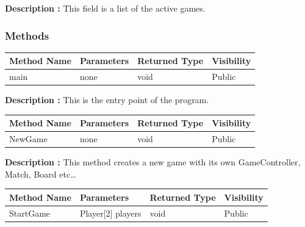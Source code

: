 \documentclass[12pt]{article}
\begin{document}
    \textbf{Description :} This field is a list of the active games.

    \subsubsection{Methods}

    \begin{table}[H]
        \begin{tabular}{|l|l|l|l|}
            \hline
            \rowcolor[HTML]{EFEFEF}
            \cellcolor[HTML]{EFEFEF}\textbf{Method Name} & \textbf{Parameters} & \textbf{Returned Type} & \textbf{Visibility} \\ \hline
            main                                         & none                & void                   & Public              \\ \hline
        \end{tabular}
    \end{table}

    \textbf{Description :} This is the entry point of the program.

    \begin{table}[H]
        \begin{tabular}{|l|l|l|l|}
            \hline
            \rowcolor[HTML]{EFEFEF}
            \cellcolor[HTML]{EFEFEF}\textbf{Method Name} & \textbf{Parameters} & \textbf{Returned Type} & \textbf{Visibility} \\ \hline
            NewGame                                      & none                & void                   & Public              \\ \hline
        \end{tabular}
    \end{table}

    \textbf{Description :} This method creates a new game with its own GameController, Match, Board etc\dots

    \begin{table}[H]
        \begin{tabular}{|l|l|l|l|}
            \hline
            \rowcolor[HTML]{EFEFEF}
            \cellcolor[HTML]{EFEFEF}\textbf{Method Name} & \textbf{Parameters} & \textbf{Returned Type} & \textbf{Visibility} \\ \hline
            StartGame                                    & Player[2] players   & void                   & Public              \\ \hline
        \end{tabular}
    \end{table}
\end{document}
